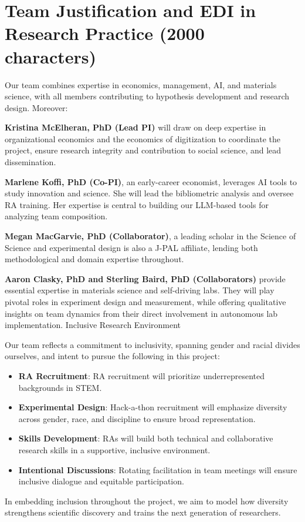 \documentclass{article}
\begin{document}
\section{Team Justification and EDI in Research Practice (2000 characters)}

Our team combines expertise in economics, management, AI, and materials science, with all members contributing to hypothesis development and research design. Moreover:


\textbf{Kristina McElheran, PhD (Lead PI)} will draw on deep expertise in organizational economics and the economics of digitization to coordinate the project, ensure research integrity and contribution to social science, and lead dissemination.

\textbf{Marlene Koffi, PhD (Co-PI)}, an early-career economist, leverages AI tools to study innovation and science. She will lead the bibliometric analysis and oversee RA training. Her expertise is central to building our LLM-based tools for analyzing team composition.

\textbf{Megan MacGarvie, PhD (Collaborator)}, a leading scholar in the Science of Science and experimental design is also a J-PAL affiliate, lending both methodological and domain expertise throughout.


\textbf{Aaron Clasky, PhD and Sterling Baird, PhD (Collaborators)} provide essential expertise in materials science and self-driving labs. They will play pivotal roles in experiment design and measurement, while offering qualitative insights on team dynamics from their direct involvement in autonomous lab implementation.
Inclusive Research Environment

Our team reflects a commitment to inclusivity, spanning gender and racial divides ourselves, and intent to pursue the following in this project:
  \begin{itemize}
  \item \textbf{RA Recruitment}: RA recruitment will prioritize underrepresented backgrounds in STEM.
  \item \textbf{Experimental Design}: Hack-a-thon recruitment will emphasize diversity across gender, race, and discipline to ensure broad representation.
  \item \textbf{Skills Development}: RAs will build both technical and collaborative research skills in a supportive, inclusive environment.
  \item \textbf{Intentional Discussions}: Rotating facilitation in team meetings will ensure inclusive dialogue and equitable participation.
\end{itemize}

In embedding inclusion throughout the project, we aim to model how diversity strengthens scientific discovery and trains the next generation of researchers.
\end{document}
